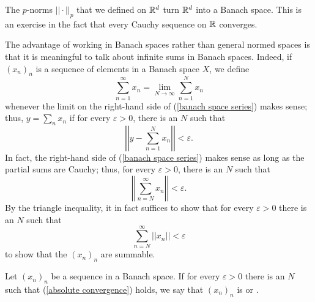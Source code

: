 \begin{example}
The $p$-norms $||\cdot||_p$ that we defined on $\mathbb{R}^d$ turn $\mathbb{R}^d$ into a Banach space.
This is an exercise in the fact that every Cauchy sequence on $\mathbb{R}$ converges.
\end{example}

The advantage of working in Banach spaces rather than general normed spaces is that it is meaningful to talk about infinite sums in Banach spaces. Indeed, if $(x_n)_n$ is a sequence of elements in a Banach space $X$, we define
\begin{equation}
\label{banach space series}
\sum_{n=1}^\infty x_n = \lim_{N \to \infty} \sum_{n=1}^N x_n
\end{equation}
whenever the limit on the right-hand side of (\ref{banach space series}) makes sense; thus, $y = \sum_n x_n$ if for every $\varepsilon > 0$, there is an $N$ such that
$$\left|\left|y - \sum_{n=1}^N x_n\right|\right| < \varepsilon.$$
In fact, the right-hand side of (\ref{banach space series}) makes sense as long as the partial sums are Cauchy; thus, for every $\varepsilon > 0$, there is an $N$ such that
$$\left|\left|\sum_{n=N}^\infty x_n\right|\right| < \varepsilon.$$
By the triangle inequality, it in fact suffices to show that for every $\varepsilon > 0$ there is an $N$ such that
\begin{equation}
\label{absolute convergence}
\sum_{n=N}^\infty ||x_n|| < \varepsilon
\end{equation}
to show that the $(x_n)_n$ are summable.
\begin{definition}
Let $(x_n)_n$ be a sequence in a Banach space. If for every $\varepsilon > 0$ there is an $N$ such that (\ref{absolute convergence}) holds, we say that $(x_n)_n$ is  or .
\end{definition}

